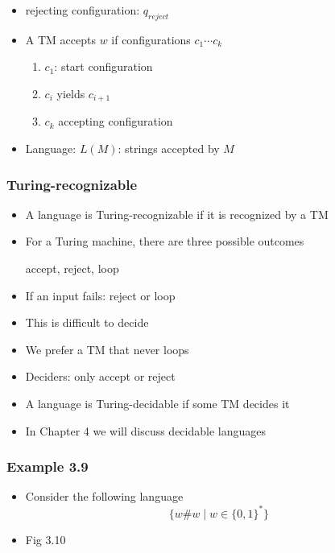 \begin{frame}[allowframebreaks]
\begin{itemize}
\item rejecting configuration: $q_{reject}$
\item A TM accepts $w$ if configurations 
$c_1 \cdots c_k$
\begin{enumerate}
\item $c_1$: start configuration
\item $c_i$ yields $c_{i+1}$
\item $c_k$ accepting configuration
\end{enumerate}
\item Language: $L(M)$: strings accepted by $M$

\end{itemize}\end{frame}


\begin{frame}[allowframebreaks] \frametitle{Turing-recognizable}
  \begin{itemize}
\item A language is Turing-recognizable if it is recognized by a TM
\item For a Turing machine, there are three possible outcomes
  \begin{center}
accept, reject, loop
\end{center}
\item If an input fails: reject or loop

\item [] This is difficult to decide
\item We prefer a TM that never loops

\item [] Deciders: only accept or reject
\item A language is Turing-decidable if some TM decides it
\item In Chapter 4 we will discuss decidable languages
  
\end{itemize}\end{frame} \begin{frame}[allowframebreaks] \frametitle{Example 3.9}
  \begin{itemize}
  \item Consider the following language
    \begin{equation*}
    \{w\# w\mid w\in \{0,1\}^*\}
  \end{equation*}

\item Fig 3.10  
 
\end{itemize}


\end{frame}
